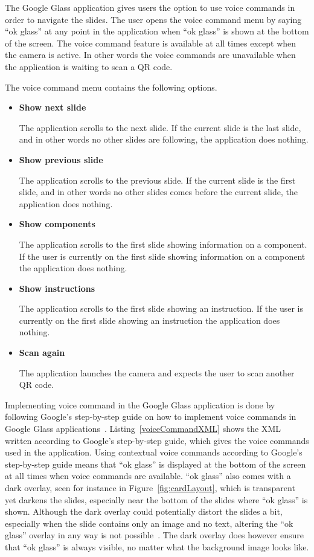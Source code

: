 The Google Glass application gives users the option to use voice commands in order to navigate the slides. The user opens the voice command menu by saying ``ok glass'' at any point in the application when ``ok glass'' is shown at the bottom of the screen. The voice command feature is available at all times except when the camera is active. In other words the voice commands are unavailable when the application is waiting to scan a QR code.

The voice command menu contains the following options.

\begin{itemize}
	\item \textbf{Show next slide}
	
	The application scrolls to the next slide. If the current slide is the last slide, and in other words no other slides are following, the application does nothing.
	\item \textbf{Show previous slide}
	
	The application scrolls to the previous slide. If the current slide is the first slide, and in other words no other slides comes before the current slide, the application does nothing.
	\item \textbf{Show components}
	
	The application scrolls to the first slide showing information on a component. If the user is currently on the first slide showing information on a component the application does nothing. 
	\item \textbf{Show instructions}
	
	The application scrolls to the first slide showing an instruction. If the user is currently on the first slide showing an instruction the application does nothing.
	\item \textbf{Scan again}
	
	The application launches the camera and expects the user to scan another QR code.
\end{itemize}

Implementing voice command in the Google Glass application is done by following Google's step-by-step guide on how to implement voice commands in Google Glass applications~\cite{howToVoiceInput}. Listing~\ref{voiceCommandXML} shows the XML written according to Google's step-by-step guide, which gives the voice commands used in the application. Using contextual voice commands according to Google's step-by-step guide means that ``ok glass'' is displayed at the bottom of the screen at all times when voice commands are available. ``ok glass'' also comes with a dark overlay, seen for instance in Figure~\ref{fig:cardLayout}, which is transparent yet darkens the slides, especially near the bottom of the slides where ``ok glass'' is shown. Although the dark overlay could potentially distort the slides a bit, especially when the slide contains only an image and no text, altering the ``ok glass'' overlay in any way is not possible~\cite{voiceCommandCustom1, voiceCommandCustom2}. The dark overlay does however ensure that ``ok glass'' is always visible, no matter what the background image looks like.

